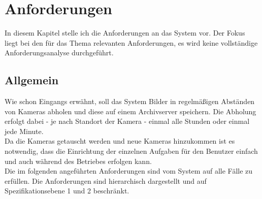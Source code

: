 \chapter{Anforderungen}\label{chap:Anforderungen}
\chapterstart
In diesem Kapitel stelle ich die Anforderungen an das System vor. Der Fokus liegt bei den für das Thema relevanten Anforderungen, es wird keine vollständige Anforderungsanalyse durchgeführt.
\section{Allgemein}
Wie schon Eingangs erwähnt, soll das System Bilder in regelmäßigen Abständen von Kameras abholen und diese auf einem Archivserver speichern. Die Abholung erfolgt dabei - je nach Standort der Kamera - einmal alle Stunden oder einmal jede Minute.\\
Da die Kameras getauscht werden und neue Kameras hinzukommen ist es notwendig, dass die Einrichtung der einzelnen Aufgaben für den Benutzer einfach und auch während des Betriebes erfolgen kann.\\
Die im folgenden angeführten Anforderungen sind vom System auf alle Fälle zu erfüllen. Die Anforderungen sind hierarchisch dargestellt und auf Spezifikationsebene 1 und 2 beschränkt\cite[S. 45]{rupp2009}.
